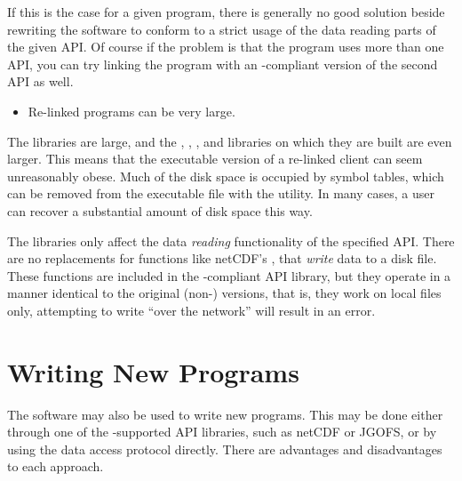 If this is the case for a given program, there is generally no good solution
beside rewriting the software to conform to a strict usage of the data
reading parts of the given API. Of course if the problem is that the
program uses more than one API, you can try linking the program with an \opendap-compliant version of the second API as well.

\begin{itemize}
\item Re-linked programs can be very large.
\end{itemize}

   
The \opendap libraries are large, and the , ,
, and  libraries on which they are built are even
larger. This means that the executable version of a re-linked \opendap
client can seem unreasonably obese. Much of the disk space is occupied
by symbol tables, which can be removed from the executable file with
the  utility.  In many cases, a user can recover a
substantial amount of disk space this way.


The \opendap libraries only affect the data \emph{reading} functionality
of the specified API. There are no \opendap replacements for functions
like netCDF's , that \emph{write} data to a disk file.
These functions are included in the \opendap-compliant API library, but
they operate in a manner identical to the original (non-\opendap)
versions, that is, they work on local files only, attempting to write
``over the network'' will result in an error.   

\section{Writing New \opendap Programs}

The \opendap software may also be used to write new programs. This may be
done either through one of the \opendap-supported API libraries, such as
netCDF or JGOFS, or by using the \opendap data access protocol directly.
There are advantages and disadvantages to each approach.
 

